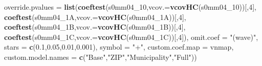 \documentclass[
]{article}
\newenvironment{Shaded}{\begin{snugshade}}{\end{snugshade}}
\newcommand{\DataTypeTok}[1]{\textcolor[rgb]{0.13,0.29,0.53}{#1}}
\newcommand{\DecValTok}[1]{\textcolor[rgb]{0.00,0.00,0.81}{#1}}
\newcommand{\FloatTok}[1]{\textcolor[rgb]{0.00,0.00,0.81}{#1}}
\newcommand{\KeywordTok}[1]{\textcolor[rgb]{0.13,0.29,0.53}{\textbf{#1}}}
\newcommand{\NormalTok}[1]{#1}
\newcommand{\StringTok}[1]{\textcolor[rgb]{0.31,0.60,0.02}{#1}}
\begin{document}
\begin{Shaded}
\begin{Highlighting}[]
          \DataTypeTok{override.pvalues =} \KeywordTok{list}\NormalTok{(}\KeywordTok{coeftest}\NormalTok{(s0mm04_}\DecValTok{10}\NormalTok{,}\DataTypeTok{vcov.=}\KeywordTok{vcovHC}\NormalTok{(s0mm04_}\DecValTok{10}\NormalTok{))[,}\DecValTok{4}\NormalTok{],}
                                  \KeywordTok{coeftest}\NormalTok{(s0mm04_1A,}\DataTypeTok{vcov.=}\KeywordTok{vcovHC}\NormalTok{(s0mm04_1A))[,}\DecValTok{4}\NormalTok{],}
                                  \KeywordTok{coeftest}\NormalTok{(s0mm04_1B,}\DataTypeTok{vcov.=}\KeywordTok{vcovHC}\NormalTok{(s0mm04_1B))[,}\DecValTok{4}\NormalTok{],}
                                  \KeywordTok{coeftest}\NormalTok{(s0mm04_1C,}\DataTypeTok{vcov.=}\KeywordTok{vcovHC}\NormalTok{(s0mm04_1C))[,}\DecValTok{4}\NormalTok{]),}
          \DataTypeTok{omit.coef =} \StringTok{"(wave)"}\NormalTok{, }\DataTypeTok{stars =} \KeywordTok{c}\NormalTok{(}\FloatTok{0.1}\NormalTok{,}\FloatTok{0.05}\NormalTok{,}\FloatTok{0.01}\NormalTok{,}\FloatTok{0.001}\NormalTok{), }\DataTypeTok{symbol =} \StringTok{"+"}\NormalTok{,}
          \DataTypeTok{custom.coef.map =}\NormalTok{ vnmap, }
          \DataTypeTok{custom.model.names =} \KeywordTok{c}\NormalTok{(}\StringTok{"Base"}\NormalTok{,}\StringTok{"ZIP"}\NormalTok{,}\StringTok{"Municipality"}\NormalTok{,}\StringTok{"Full"}\NormalTok{))}
\end{Highlighting}
\end{Shaded}
\end{document}
